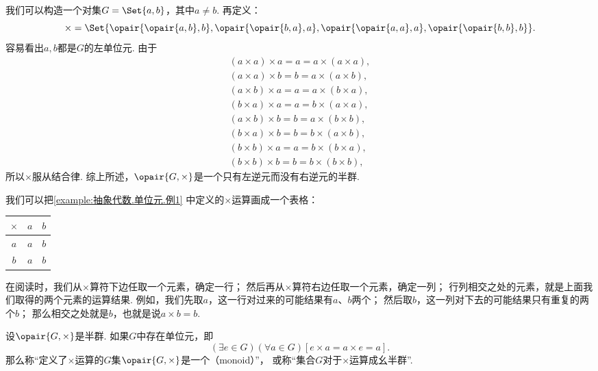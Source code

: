 \begin{example}\label{example:抽象代数.单位元.例1}
我们可以构造一个对集\(G = \Set{ a, b }\)，其中\(a \neq b\).
再定义：\[
	\times = \Set{
		\opair{\opair{a,b},b},
		\opair{\opair{b,a},a},
		\opair{\opair{a,a},a},
		\opair{\opair{b,b},b}
	}.
\]
容易看出\(a,b\)都是\(G\)的左单位元.
由于\begin{align*}
	(a \times a) \times a = a = a \times (a \times a), \\
	(a \times a) \times b = b = a \times (a \times b), \\
	(a \times b) \times a = a = a \times (b \times a), \\
	(b \times a) \times a = a = b \times (a \times a), \\
	(a \times b) \times b = b = a \times (b \times b), \\
	(b \times a) \times b = b = b \times (a \times b), \\
	(b \times b) \times a = a = b \times (b \times a), \\
	(b \times b) \times b = b = b \times (b \times b),
\end{align*}
所以\(\times\)服从结合律.
综上所述，\(\opair{G,\times}\)是一个只有左逆元而没有右逆元的半群.
\end{example}

\begin{example}
我们可以把\cref{example:抽象代数.单位元.例1} 中定义的\(\times\)运算画成一个表格：
\begin{center}
\begin{tabular}{c|cc}
	\(\times\) & \(a\) & \(b\) \\ \hline
	\(a\) & \(a\) & \(b\) \\
	\(b\) & \(a\) & \(b\) \\
\end{tabular}
\end{center}
在阅读时，我们从\(\times\)算符下边任取一个元素，确定一行；
然后再从\(\times\)算符右边任取一个元素，确定一列；
行列相交之处的元素，就是上面我们取得的两个元素的运算结果.
例如，我们先取\(a\)，这一行对过来的可能结果有\(a\)、\(b\)两个；
然后取\(b\)，这一列对下去的可能结果只有重复的两个\(b\)；
那么相交之处就是\(b\)，也就是说\(a \times b = b\).
\end{example}

\begin{definition}\label{definition:抽象代数.幺半群的定义}
设\(\opair{G,\times}\)是半群.
如果\(G\)中存在单位元，即\[
	(\exists e \in G)(\forall a \in G)
	[e \times a = a \times e = a].
\]
那么称“定义了\(\times\)运算的\(G\)集\(\opair{G,\times}\)是一个（monoid）”，
或称“集合\(G\)对于\(\times\)运算成幺半群”.
\end{definition}

